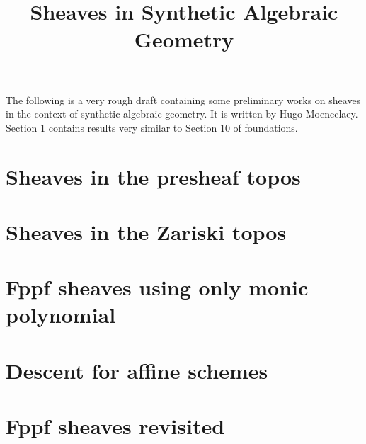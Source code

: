 \documentclass{../util/zariski}
\title{Sheaves in Synthetic Algebraic Geometry}
\begin{document}
\maketitle

The following is a very rough draft containing some preliminary works on sheaves in the context of synthetic algebraic geometry. It is written by Hugo Moeneclaey. Section 1 contains results very similar to Section 10 of foundations.

\tableofcontents

\section{Sheaves in the presheaf topos}


\section{Sheaves in the Zariski topos}


\section{Fppf sheaves using only monic polynomial}


\section{Descent for affine schemes}


\section{Fppf sheaves revisited}




\printindex

\printbibliography
\end{document}
